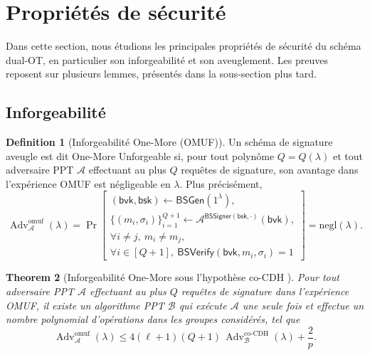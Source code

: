 \documentclass[10pt,a4paper]{article}
\theoremstyle{definition}
\newtheorem{definition}{Definition}[section]
\theoremstyle{plain}
\newtheorem{theorem}[definition]{Theorem}
\theoremstyle{remark}
\newcommand{\negl}{\mathrm{negl}}
\begin{document}
\section{Propriétés de sécurité}

Dans cette section, nous étudions les principales propriétés de sécurité du
schéma dual-OT, en particulier son inforgeabilité et son aveuglement. Les preuves
reposent sur plusieurs lemmes, présentés dans la sous-section plus tard.

\subsection{Inforgeabilité}\label{sec:inforgeability}

\begin{definition}[Inforgeabilité One-More (OMUF)] 
\label{definition:def-18}
Un schéma de signature aveugle est dit One-More Unforgeable \cite{jlo1997}
si, pour tout polynôme $Q=Q(\lambda)$ et tout adversaire PPT
$\mathcal{A}$ effectuant au plus $Q$ requêtes de signature, son
avantage dans l'expérience OMUF est négligeable en $\lambda$.
Plus précisément,
\[
\operatorname{Adv}_{\mathcal{A}}^{\mathrm{omuf}}(\lambda)
=
\Pr\left[
\begin{array}{l}
(\mathsf{bvk},\mathsf{bsk})
\gets \mathsf{BSGen}(1^\lambda),\\
\{(m_i,\sigma_i)\}_{i=1}^{Q+1}
\gets
\mathcal{A}^{\mathsf{BSSigner}(\mathsf{bsk},\cdot)}
(\mathsf{bvk}),\\
\forall i\neq j,\ m_i\neq m_j,\\
\forall i\in[Q+1],\
\mathsf{BSVerify}(\mathsf{bvk},m_i,\sigma_i)=1
\end{array}
\right]
=\negl(\lambda).
\]
\end{definition}

\begin{theorem}[Inforgeabilité One-More sous l'hypothèse co-CDH \cite{boneyboyen2004}]
Pour tout adversaire PPT $\mathcal{A}$ effectuant au plus $Q$ requêtes
de signature dans l'expérience OMUF, il existe un algorithme PPT
$\mathcal{B}$ qui exécute $\mathcal{A}$ une seule fois et effectue un
nombre polynomial d'opérations dans les groupes considérés, tel que
\[
\operatorname{Adv}_{\mathcal{A}}^{\mathrm{omuf}}(\lambda)
\leq
4(\ell+1)(Q+1)\,
\operatorname{Adv}_{\mathcal{B}}^{\mathrm{co\text{-}CDH}}(\lambda)
+
\frac{2}{p}.
\]
\end{theorem}
\end{document}
